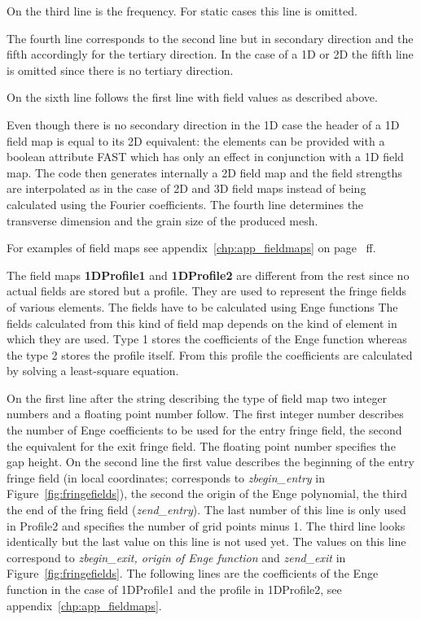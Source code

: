 On the third line is the frequency. For static cases this line is omitted.

The fourth line corresponds to the second line but in secondary direction and the fifth accordingly for the tertiary direction. In the case of a 1D or 2D the fifth line is omitted since there is no tertiary direction.

On the sixth line follows the first line with field values as described above.

Even though there is no secondary direction in the 1D case the header of a 1D field map is equal to its 2D equivalent: the elements can be provided with a boolean attribute FAST which has only an effect in conjunction with a 1D field map. The code then generates internally a 2D field map and the field strengths are interpolated as in the case of 2D and 3D field maps instead of being calculated using the Fourier coefficients. The fourth line determines the transverse dimension and the grain size of the produced mesh.

\noindent For examples of field maps see appendix~\ref{chp:app_fieldmaps} on page~\pageref{chp:app_fieldmaps} ff.

The field maps {\bf 1DProfile1} and {\bf 1DProfile2} are different from the rest since no actual fields are stored but a profile. They are used to represent the fringe fields of various elements. The fields have to be calculated using Enge functions \cite{enge} The fields calculated from this kind of field map depends on the kind of element in which they are used. Type 1 stores the coefficients of the Enge function whereas the type 2 stores the profile itself. From this profile the coefficients are calculated by solving a least-square equation. 

On the first line after the string describing the type of field map two integer numbers and a floating point number follow. The first integer number describes the number of Enge coefficients to be used for the entry fringe field, the second the equivalent for the exit fringe field. The floating point number specifies the gap height. On the second line the first value describes the beginning of the entry fringe field (in local coordinates; corresponds to {\sl zbegin\_entry} in Figure~\ref{fig:fringefields}), the second the origin of the Enge polynomial, the third the end of the fring field ({\sl zend\_entry}). The last number of this line is only used in Profile2 and specifies the number of grid points minus 1. The third line looks identically but the last value on this line is not used yet. The values on this line correspond to {\sl zbegin\_exit, origin of Enge function} and {\sl zend\_exit} in Figure~\ref{fig:fringefields}. The following lines are the coefficients of the Enge function in the case of 1DProfile1 and the profile in 1DProfile2, see appendix~\ref{chp:app_fieldmaps}.


